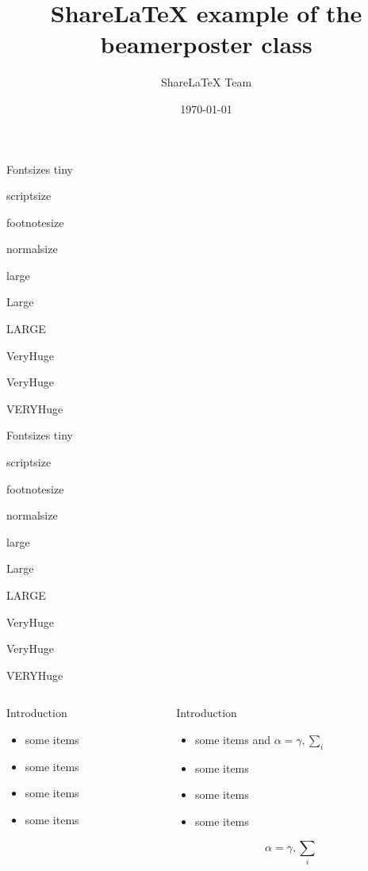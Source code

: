 \documentclass{beamer}
\title[Beamer Poster]{ShareLaTeX example of the beamerposter class}
\author[sharelatexteam@sharelate.com]{ShareLaTeX Team}
\institute[Sharelatex University]
  {The ShareLaTeX institute, Learn faculty}
\date{\today}
\begin{document}
  \begin{frame}{} 
    \vfill
    \begin{block}{\large Fontsizes}
      \centering
      {\tiny tiny}\par
      {\scriptsize scriptsize}\par
      {\footnotesize footnotesize}\par
      {\normalsize normalsize}\par
      {\large large}\par
      {\Large Large}\par
      {\LARGE LARGE}\par
      {\veryHuge VeryHuge}\par
      {\VeryHuge VeryHuge}\par
      {\VERYHuge VERYHuge}\par
    \end{block}
    \vfill
    \vfill
    \begin{block}{\large Fontsizes}
      \centering
      {\tiny tiny}\par
      {\scriptsize scriptsize}\par
      {\footnotesize footnotesize}\par
      {\normalsize normalsize}\par
      {\large large}\par
      {\Large Large}\par
      {\LARGE LARGE}\par
      {\veryHuge VeryHuge}\par
      {\VeryHuge VeryHuge}\par
      {\VERYHuge VERYHuge}\par
    \end{block}
    \vfill
    \begin{columns}[t]
      \begin{column}{.30\linewidth}
        \begin{block}{Introduction}
          \begin{itemize}
          \item some items
          \item some items
          \item some items
          \item some items
          \end{itemize}
        \end{block}
      \end{column}
      \begin{column}{.48\linewidth}
        \begin{block}{Introduction}
          \begin{itemize}
          \item some items and $\alpha=\gamma, \sum_{i}$
          \item some items
          \item some items
          \item some items
          \end{itemize}
          $$\alpha=\gamma, \sum_{i}$$
        \end{block}


\end{column}
\end{columns}
\end{frame}
\end{document}
